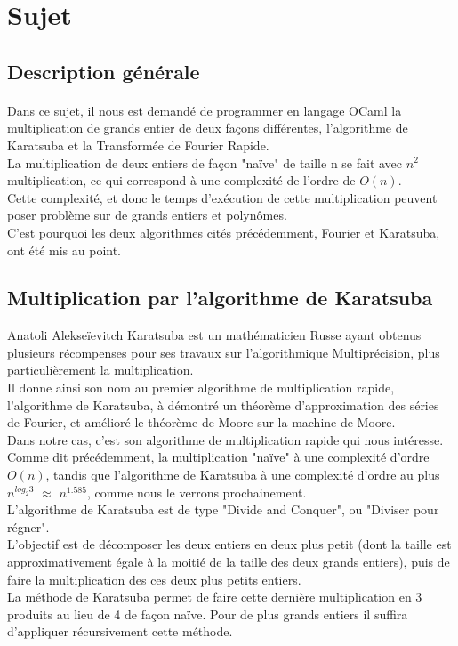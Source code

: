 \documentclass[a4paper]{report}
\begin{document}
  \section{Sujet}

    \subsection{Description générale} %
      \paragraph{}
      Dans ce sujet, il nous est demandé de programmer en langage OCaml la multiplication de grands entier de deux façons différentes, l'algorithme de Karatsuba \cite{KaratsuINRIA} \cite{KaratsuUnivLyon} \cite{KaratsuWiki}  et la Transformée de Fourier Rapide.\\
      La multiplication de deux entiers de façon "naïve" de taille n se fait avec $n^2$ multiplication, ce qui correspond à une complexité de l'ordre de $O(n)$.
      \\Cette complexité, et donc le temps d'exécution de cette multiplication peuvent poser problème sur de grands entiers et polynômes.
      \\C'est pourquoi les deux algorithmes cités précédemment, Fourier et Karatsuba, ont été mis au point.
      \paragraph{}
      	\subsection{Multiplication par l'algorithme de Karatsuba} 
      	Anatoli Alekseïevitch Karatsuba est un mathématicien Russe ayant obtenus plusieurs récompenses pour ses travaux sur l'algorithmique Multiprécision, plus particulièrement la multiplication.
      	\\ Il donne ainsi son nom au premier algorithme de multiplication rapide, l'algorithme de Karatsuba, à démontré un théorème d'approximation des séries de Fourier, et amélioré le théorème de Moore sur la machine de Moore.
      	\\ Dans notre cas, c'est son algorithme de multiplication rapide qui nous intéresse.
      	\\ Comme dit précédemment, la multiplication "naïve" à une complexité d'ordre $O(n)$, tandis que l'algorithme de Karatsuba à une complexité d'ordre au plus $n^{log_2 3}$ $\approx$ $n^{1.585}$, comme nous le verrons prochainement.
      	\\ L'algorithme de Karatsuba est de type "Divide and Conquer", ou "Diviser pour régner".
      	\\ L'objectif est de décomposer les deux entiers en deux plus petit (dont la taille est approximativement égale à la moitié de la taille des deux grands entiers), puis de faire la multiplication des ces deux plus petits entiers.
      	\\ La méthode de Karatsuba permet de faire cette dernière multiplication en 3 produits au lieu de 4 de façon naïve. Pour de plus grands entiers il suffira d'appliquer récursivement cette méthode.
\end{document}
